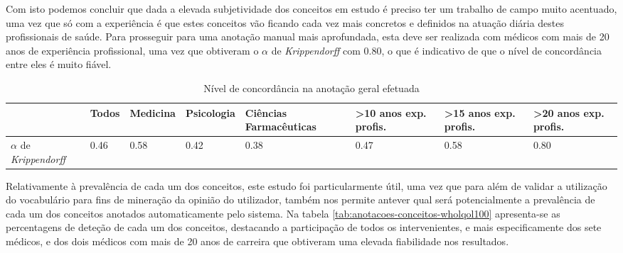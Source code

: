 \par Com isto podemos concluir que dada a elevada subjetividade dos conceitos em estudo é preciso ter um trabalho de campo muito acentuado, uma vez que só com a experiência é que estes conceitos vão ficando cada vez mais concretos e definidos na atuação diária destes profissionais de saúde. Para prosseguir para uma anotação manual mais aprofundada, esta deve ser realizada com médicos com mais de 20 anos de experiência profissional, uma vez que obtiveram o \begin{math}\alpha\end{math} de \textit{Krippendorff} com 0.80, o que é indicativo de que o nível de concordância entre eles é muito fiável.

\begin{table}[H]
\centering
\renewcommand{\arraystretch}{1.3}
\begin{tabular}{|m{1.5cm}|m{1.1cm}|m{1.6cm}|m{1.7cm}|m{1.6cm}|m{1.3cm}|m{1.3cm}|m{1.3cm}|}
\hline
\textbf{}&\textbf{Todos}&\textbf{Medicina}&\textbf{Psicologia}&\textbf{Ciências Farmacêuticas}&\textbf{>10 anos exp. profis.} & \textbf{>15 anos exp. profis.} & \textbf{>20 anos exp. profis.}\\ \hline

\begin{math}\alpha\end{math} de \textit{Krippendorff} &
0.46 & 0.58 & 0.42 & 0.38 & 0.47 & 0.58 & 0.80\\ \hline
\end{tabular}
\caption{\label{tab:anotacoes-wholqol100}Nível de concordância na anotação geral efetuada}
\end{table}

\par Relativamente à prevalência de cada um dos conceitos, este estudo foi particularmente útil, uma vez que para além de validar a utilização do vocabulário para fins de mineração da opinião do utilizador, também nos permite antever qual será potencialmente a prevalência de cada um dos conceitos anotados automaticamente pelo sistema. Na tabela \ref{tab:anotacoes-conceitos-wholqol100} apresenta-se as percentagens de deteção de cada um dos conceitos, destacando a participação de todos os intervenientes, e mais especificamente dos sete médicos, e dos dois médicos com mais de 20 anos de carreira que obtiveram uma elevada fiabilidade nos resultados.

